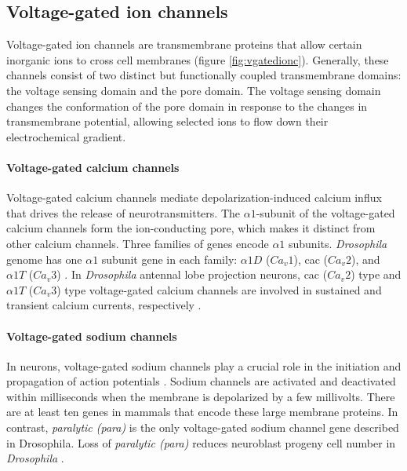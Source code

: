 \subsection{Voltage-gated ion channels}
Voltage-gated ion channels are transmembrane proteins that allow certain inorganic ions to cross cell membranes (figure  \ref{fig:vgatedionc}). Generally, these channels consist of two distinct but functionally coupled transmembrane domains: the voltage sensing domain and the pore domain. The voltage sensing domain changes the conformation of the pore domain in response to the changes in transmembrane potential, allowing selected ions to flow down their electrochemical gradient. 

\paragraph{Voltage-gated calcium channels}
Voltage-gated calcium channels mediate depolarization-induced calcium influx that drives the release of neurotransmitters. The $\alpha1$-subunit of the voltage-gated calcium channels form the ion-conducting pore, which makes it distinct from other calcium channels. Three families of genes encode $\alpha1$ subunits. \textit{Drosophila} genome has one $\alpha1$ subunit gene in each family: $\alpha1D$ ($Ca_{v}1$), cac ($Ca_{v}2$), and $\alpha1T$ ($Ca_{v}3$) \parencite{Littleton2000, King2007}. In \textit{Drosophila} antennal lobe projection neurons, cac ($Ca_{v}2$) type and $\alpha1T$ ($Ca_{v}3$) type voltage-gated calcium channels are involved in sustained and transient calcium currents, respectively \parencite{Gu2009, Iniguez2013}.

\paragraph{Voltage-gated sodium channels}
In neurons, voltage-gated sodium channels play a crucial role in the initiation and propagation of action potentials \parencite{Hodgkin1952}. Sodium channels are activated and deactivated within milliseconds when the membrane is depolarized by a few millivolts. There are at least ten genes in mammals that encode these large membrane proteins. In contrast, \textit{paralytic (para)} is the only voltage-gated sodium channel gene described in Drosophila. Loss of \textit{paralytic (para)} reduces neuroblast progeny cell number in \textit{Drosophila} \parencite{Piggott2019}.

